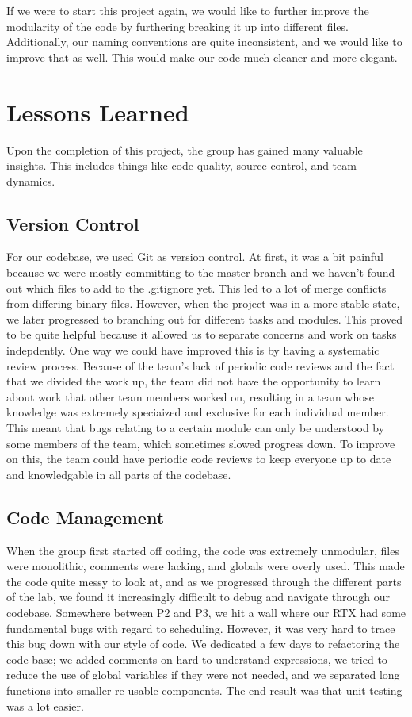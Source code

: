 \documentclass[12pt]{report}
\begin{document}
If we were to start this project again, we would like to further improve the modularity of the code by furthering breaking it up into different files. Additionally, our naming conventions are quite inconsistent, and we would like to improve that as well. This would make our code much cleaner and more elegant. 

\chapter{Lessons Learned}

Upon the completion of this project, the group has gained many valuable insights. This includes things like code quality, source control, and team dynamics.

\section{Version Control}
For our codebase, we used Git as version control. At first, it was a bit painful because we were mostly committing to the master branch and we haven't found out which files to add to the .gitignore yet. This led to a lot of merge conflicts from differing binary files.
However, when the project was in a more stable state, we later progressed to branching out for different tasks and modules. This proved to be quite helpful because it allowed us to separate concerns and work on tasks indepdently.
One way we could have improved this is by having a systematic review process. Because of the team's lack of periodic code reviews and the fact that we divided the work up, the team did not have the opportunity to learn about work that other team members worked on, resulting in a team whose knowledge was extremely speciaized and exclusive for each individual member. This meant that bugs relating to a certain module can only be understood by some members of the team, which sometimes slowed progress down. To improve on this, the team could have periodic code reviews to keep everyone up to date and knowledgable in all parts of the codebase.

\section{Code Management}
When the group first started off coding, the code was extremely unmodular, files were monolithic, comments were lacking, and globals were overly used. This made the code quite messy to look at, and as we progressed through the different parts of the lab, we found it increasingly difficult to debug and navigate through our codebase. Somewhere between P2 and P3, we hit a wall where our RTX had some fundamental bugs with regard to scheduling. However, it was very hard to trace this bug down with our style of code. We dedicated a few days to refactoring the code base; we added comments on hard to understand expressions, we tried to reduce the use of global variables if they were not needed, and we separated long functions into smaller re-usable components. The end result was that unit testing was a lot easier.
\end{document}
